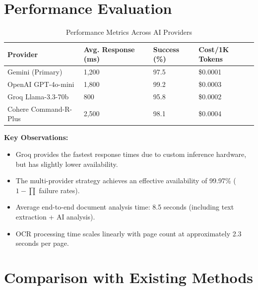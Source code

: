 \documentclass[12pt,a4paper,oneside]{report}
\begin{document}
\section{Performance Evaluation}

\begin{table}[htbp]
\centering
\caption{Performance Metrics Across AI Providers}
\label{tab:performance}
\begin{tabular}{|p{4cm}|p{3cm}|p{2.5cm}|p{2.5cm}|}
\hline
\textbf{Provider} & \textbf{Avg. Response (ms)} & \textbf{Success (\%)} & \textbf{Cost/1K Tokens} \\
\hline
Gemini (Primary) & 1,200 & 97.5 & \$0.0001 \\ \hline
OpenAI GPT-4o-mini & 1,800 & 99.2 & \$0.0003 \\ \hline
Groq Llama-3.3-70b & 800 & 95.8 & \$0.0002 \\ \hline
Cohere Command-R-Plus & 2,500 & 98.1 & \$0.0004 \\ \hline
\end{tabular}
\end{table}

\textbf{Key Observations:}
\begin{itemize}[leftmargin=2cm]
  \item Groq provides the fastest response times due to custom inference hardware, but has slightly lower availability.
  \item The multi-provider strategy achieves an effective availability of 99.97\% ($1 - \prod$ failure rates).
  \item Average end-to-end document analysis time: 8.5 seconds (including text extraction + AI analysis).
  \item OCR processing time scales linearly with page count at approximately 2.3 seconds per page.
\end{itemize}

\section{Comparison with Existing Methods}
\end{document}
